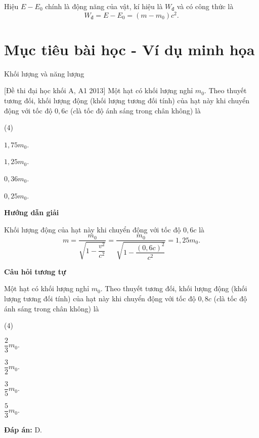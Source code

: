 Hiệu $E-E_0$ chính là động năng của vật, kí hiệu là $W_\text{đ}$ và có công thức là
\begin{equation}
	W_\text{đ}=E-E_0=(m-m_0)c^2.
\end{equation}

\section{Mục tiêu bài học - Ví dụ minh họa}

\begin{dang}{Khối lượng và năng lượng}
	
	{[Đề thi đại học khối A, A1 2013] Một hạt có khối lượng nghỉ $m_0$. Theo thuyết tương đối, khối lượng động (khối lượng tương đối tính) của hạt này khi chuyển động với tốc độ $0,6c$ ($c$là tốc độ ánh sáng trong chân không) là
		\begin{mcq}(4)
			\item $1,75 m_0$.
			\item $1,25 m_0$.
			\item $0,36 m_0$.
			\item $0,25 m_0$.
	\end{mcq}}
	{\begin{center}
			\textbf{Hướng dẫn giải}
		\end{center}
		Khối lượng động của hạt này khi chuyển động với tốc độ $0,6c$ là
		\begin{equation*}
			m=\dfrac{m_0}{\sqrt{1-\dfrac{v^2}{c^2}}}=\dfrac{m_0}{\sqrt{1-\dfrac{(0,6c)^2}{c^2}}}=1,25 m_0.
		\end{equation*}
		
		\begin{center}
			\textbf{Câu hỏi tương tự}
		\end{center}
		
		Một hạt có khối lượng nghỉ $m_0$. Theo thuyết tương đối, khối lượng động (khối lượng tương đối tính) của hạt này khi chuyển động với tốc độ $0,8c$ ($c$là tốc độ ánh sáng trong chân không) là
		\begin{mcq}(4)
			\item $\dfrac{2}{3} m_0$.
			\item $\dfrac{3}{2} m_0$.
			\item $\dfrac{3}{5} m_0$.
			\item $\dfrac{5}{3} m_0$.
		\end{mcq}
		\textbf{Đáp án:} D.
	}
	

\end{dang}

